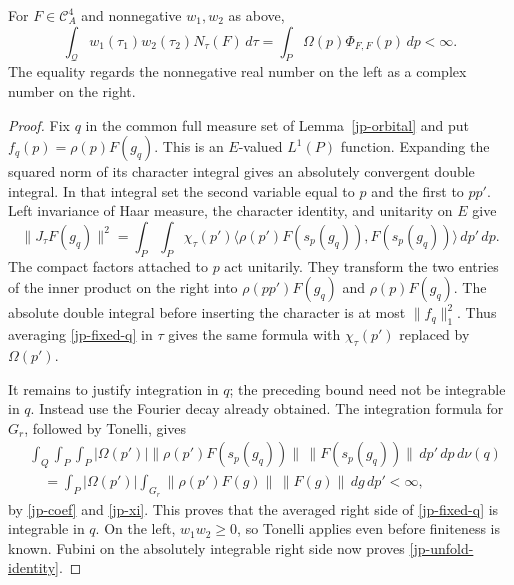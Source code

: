 \begin{proposition}\label{jp-unfold}
For \(F\in\mathcal C_A^4\) and nonnegative \(w_1,w_2\) as above,
\begin{equation}\label{jp-unfold-identity}
 \int_{\mathcal Q}w_1(\tau_1)w_2(\tau_2)N_\tau(F)\,d\tau
                  =\int_P\Omega(p)\Phi_{F,F}(p)\,dp<\infty .
\end{equation}
The equality regards the nonnegative real number on the left
as a complex number on the right.
\end{proposition}

\begin{proof}
Fix \(q\) in the common full measure set of
Lemma~\ref{jp-orbital} and put \(f_q(p)=\rho(p)F(g_q)\).
This is an \(E\)-valued \(L^1(P)\) function.
Expanding the squared norm of its character integral gives
an absolutely convergent double integral.
In that integral set the second variable equal to \(p\)
and the first to \(pp'\).
Left invariance of Haar measure, the character identity,
and unitarity on \(E\) give
\begin{equation}\label{jp-fixed-q}
 \|J_\tau F(g_q)\|^2
 =\int_P\int_P \chi_\tau(p')
     \langle\rho(p')F(s_p(g_q)),F(s_p(g_q))\rangle\,dp'\,dp .
\end{equation}
The compact factors attached to \(p\) act unitarily.
They transform the two entries of the inner product on
the right into \(\rho(pp')F(g_q)\) and \(\rho(p)F(g_q)\).
The absolute double integral before inserting the character
is at most \(\|f_q\|_1^2\).
Thus averaging \eqref{jp-fixed-q} in \(\tau\) gives the same
formula with \(\chi_\tau(p')\) replaced by \(\Omega(p')\).

It remains to justify integration in \(q\); the preceding
bound need not be integrable in \(q\).
Instead use the Fourier decay already obtained.
The integration formula for \(G_r\), followed by Tonelli, gives
\[
 \begin{split}
 &\int_Q\int_P\int_P|\Omega(p')|
       \|\rho(p')F(s_p(g_q))\|\,\|F(s_p(g_q))\|
                        \,dp'\,dp\,d\nu(q)\\
 &\quad=\int_P|\Omega(p')|
               \int_{G_r}\|\rho(p')F(g)\|\,\|F(g)\|\,dg\,dp'
 <\infty ,
 \end{split}
\]
by \eqref{jp-coef} and \eqref{jp-xi}.
This proves that the averaged right side of
\eqref{jp-fixed-q} is integrable in \(q\).
On the left, \(w_1w_2\geq0\), so Tonelli applies even before
finiteness is known.  Fubini on the absolutely integrable
right side now proves \eqref{jp-unfold-identity}.
\end{proof}

